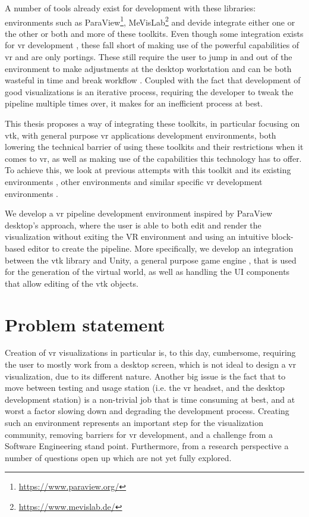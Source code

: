 A number of tools already exist for development with these libraries: environments such as ParaView\footnote{\url{https://www.paraview.org/}}, MeVisLab\footnote{\url{https://www.mevislab.de/}} and \acrfull{devide} \cite{botha_devide_2004} integrate either one or the other or both and more of these toolkits. Even though some integration exists for \acrshort{vr} development \cite{sua_virtual_2015, shetty_immersive_2011}, these fall short of making use of the powerful capabilities of \acrshort{vr} and are only portings. These still require the user to jump in and out of the environment to make adjustments at the desktop workstation and can be both wasteful in time and break workflow \cite{belleman_interactive_2003, dreuning_visual_2016, kruis_creating_2017, schutte_virtual_2018}. Coupled with the fact that development of good visualizations is an iterative process, requiring the developer to tweak the pipeline multiple times over, it makes for an inefficient process at best.

This thesis proposes a way of integrating these toolkits, in particular focusing on \acrshort{vtk}, with general purpose \acrshort{vr} applications development environments, both lowering the technical barrier of using these toolkits and their restrictions when it comes to \acrshort{vr}, as well as making use of the capabilities this technology has to offer. To achieve this, we look at previous attempts with this toolkit and its existing environments \cite{dreuning_visual_2016, kruis_creating_2017, schutte_virtual_2018}, other environments \cite{wheeler_virtual_2018} and similar specific \acrshort{vr} development environments \cite{vanhorn_deep_2019}.

We develop a \acrshort{vr} pipeline development environment inspired by ParaView desktop's approach, where the user is able to both edit and render the visualization without exiting the VR environment and using an intuitive block-based editor to create the pipeline. More specifically, we develop an integration between the \acrshort{vtk} library and Unity, a general purpose game engine \cite{haas2014history}, that is used for the generation of the virtual world, as well as handling the UI components that allow editing of the \acrshort{vtk} objects.

\section{Problem statement}

Creation of \acrshort{vr} visualizations in particular is, to this day, cumbersome, requiring the user to mostly work from a desktop screen, which is not ideal to design a \acrshort{vr} visualization, due to its different nature. Another big issue is the fact that to move between testing and usage station (i.e. the \acrshort{vr} headset, and the desktop development station) is a non-trivial job that is time consuming at best, and at worst a factor slowing down and degrading the development process. Creating such an environment represents an important step for the visualization community, removing barriers for \acrshort{vr} development, and a challenge from a Software Engineering stand point. Furthermore, from a research perspective a number of questions open up which are not yet fully explored.

